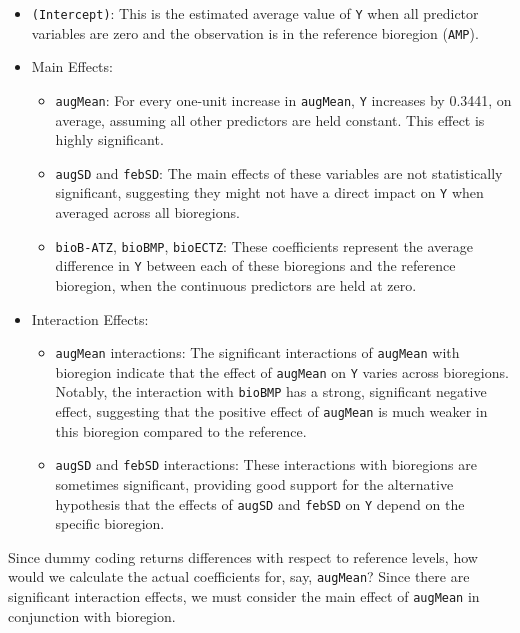 \documentclass[
  letterpaper,
]{book}
\providecommand{\tightlist}{%
  \setlength{\itemsep}{0pt}\setlength{\parskip}{0pt}}\usepackage{longtable,booktabs,array}
\begin{document}
\begin{itemize}
\tightlist
\item
  \texttt{(Intercept)}: This is the estimated average value of
  \texttt{Y} when all predictor variables are zero and the observation
  is in the reference bioregion (\texttt{AMP}).
\item
  Main Effects:

  \begin{itemize}
  \tightlist
  \item
    \texttt{augMean}: For every one-unit increase in \texttt{augMean},
    \texttt{Y} increases by 0.3441, on average, assuming all other
    predictors are held constant. This effect is highly significant.
  \item
    \texttt{augSD} and \texttt{febSD}: The main effects of these
    variables are not statistically significant, suggesting they might
    not have a direct impact on \texttt{Y} when averaged across all
    bioregions.
  \item
    \texttt{bioB-ATZ}, \texttt{bioBMP}, \texttt{bioECTZ}: These
    coefficients represent the average difference in \texttt{Y} between
    each of these bioregions and the reference bioregion, when the
    continuous predictors are held at zero.
  \end{itemize}
\item
  Interaction Effects:

  \begin{itemize}
  \tightlist
  \item
    \texttt{augMean} interactions: The significant interactions of
    \texttt{augMean} with bioregion indicate that the effect of
    \texttt{augMean} on \texttt{Y} varies across bioregions. Notably,
    the interaction with \texttt{bioBMP} has a strong, significant
    negative effect, suggesting that the positive effect of
    \texttt{augMean} is much weaker in this bioregion compared to the
    reference.
  \item
    \texttt{augSD} and \texttt{febSD} interactions: These interactions
    with bioregions are sometimes significant, providing good support
    for the alternative hypothesis that the effects of \texttt{augSD}
    and \texttt{febSD} on \texttt{Y} depend on the specific bioregion.
  \end{itemize}
\end{itemize}

Since dummy coding returns differences with respect to reference levels,
how would we calculate the actual coefficients for, say,
\texttt{augMean}? Since there are significant interaction effects, we
must consider the main effect of \texttt{augMean} in conjunction with
bioregion.
\end{document}
